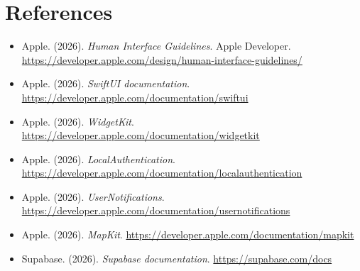 \documentclass[12pt,a4paper]{article}
\begin{document}
\section{References}
\begin{itemize}
    \item Apple. (2026). \textit{Human Interface Guidelines}. Apple Developer. \url{https://developer.apple.com/design/human-interface-guidelines/}
    \item Apple. (2026). \textit{SwiftUI documentation}. \url{https://developer.apple.com/documentation/swiftui}
    \item Apple. (2026). \textit{WidgetKit}. \url{https://developer.apple.com/documentation/widgetkit}
    \item Apple. (2026). \textit{LocalAuthentication}. \url{https://developer.apple.com/documentation/localauthentication}
    \item Apple. (2026). \textit{UserNotifications}. \url{https://developer.apple.com/documentation/usernotifications}
    \item Apple. (2026). \textit{MapKit}. \url{https://developer.apple.com/documentation/mapkit}
    \item Supabase. (2026). \textit{Supabase documentation}. \url{https://supabase.com/docs}
\end{itemize}
\end{document}
